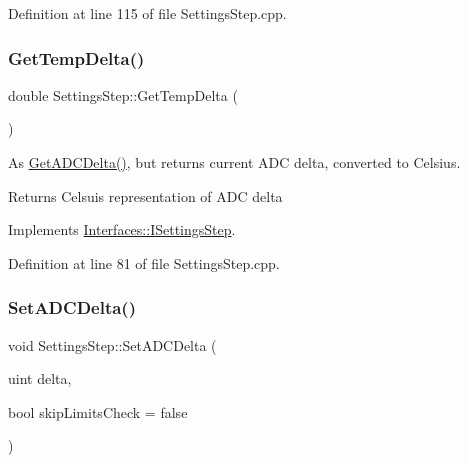Definition at line 115 of file Settings\+Step.\+cpp.

\mbox{\label{class_settings_step_a8162810e5ce2df99053ac5722acc0901}} 
\subsubsection{\texorpdfstring{Get\+Temp\+Delta()}{GetTempDelta()}}
{\footnotesize\ttfamily double Settings\+Step\+::\+Get\+Temp\+Delta (\begin{DoxyParamCaption}{ }\end{DoxyParamCaption})\hspace{0.3cm}{\ttfamily [virtual]}}



As \hyperlink{class_settings_step_aee30aaa97692d6b546e9dd002900f52e}{Get\+A\+D\+C\+Delta()}, but returns current A\+DC delta, converted to Celsius. 

\begin{DoxyReturn}{Returns}
Celsuis representation of A\+DC delta 
\end{DoxyReturn}


Implements \hyperlink{class_interfaces_1_1_i_settings_step_a7dd93517fbd9bc10a54b3b35a2f8bd78}{Interfaces\+::\+I\+Settings\+Step}.



Definition at line 81 of file Settings\+Step.\+cpp.

\mbox{\label{class_settings_step_a8124c87ae0b1d9fb3b623144d0e492db}} 
\subsubsection{\texorpdfstring{Set\+A\+D\+C\+Delta()}{SetADCDelta()}}
{\footnotesize\ttfamily void Settings\+Step\+::\+Set\+A\+D\+C\+Delta (\begin{DoxyParamCaption}\item[{uint}]{delta,  }\item[{bool}]{skip\+Limits\+Check = {\ttfamily false} }\end{DoxyParamCaption})\hspace{0.3cm}{\ttfamily [virtual]}}



